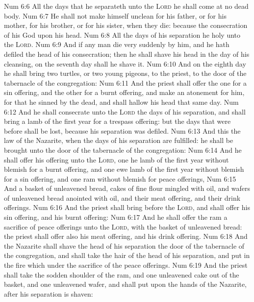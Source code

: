 \vs Num 6:6 All the days that he separateth  unto the \textsc{Lord} he shall come at no dead body.
\vs Num 6:7 He shall not make himself unclean for his father, or for his mother, for his brother, or for his sister, when they die: because the consecration of his God  upon his head.
\vs Num 6:8 All the days of his separation he  holy unto the \textsc{Lord}.
\vs Num 6:9 And if any man die very suddenly by him, and he hath defiled the head of his consecration; then he shall shave his head in the day of his cleansing, on the seventh day shall he shave it.
\vs Num 6:10 And on the eighth day he shall bring two turtles, or two young pigeons, to the priest, to the door of the tabernacle of the congregation:
\vs Num 6:11 And the priest shall offer the one for a sin offering, and the other for a burnt offering, and make an atonement for him, for that he sinned by the dead, and shall hallow his head that same day.
\vs Num 6:12 And he shall consecrate unto the \textsc{Lord} the days of his separation, and shall bring a lamb of the first year for a trespass offering: but the days that were before shall be lost, because his separation was defiled.
\vs Num 6:13 And this  the law of the Nazarite, when the days of his separation are fulfilled: he shall be brought unto the door of the tabernacle of the congregation:
\vs Num 6:14 And he shall offer his offering unto the \textsc{Lord}, one he lamb of the first year without blemish for a burnt offering, and one ewe lamb of the first year without blemish for a sin offering, and one ram without blemish for peace offerings,
\vs Num 6:15 And a basket of unleavened bread, cakes of fine flour mingled with oil, and wafers of unleavened bread anointed with oil, and their meat offering, and their drink offerings.
\vs Num 6:16 And the priest shall bring  before the \textsc{Lord}, and shall offer his sin offering, and his burnt offering:
\vs Num 6:17 And he shall offer the ram  a sacrifice of peace offerings unto the \textsc{Lord}, with the basket of unleavened bread: the priest shall offer also his meat offering, and his drink offering.
\vs Num 6:18 And the Nazarite shall shave the head of his separation  the door of the tabernacle of the congregation, and shall take the hair of the head of his separation, and put  in the fire which  under the sacrifice of the peace offerings.
\vs Num 6:19 And the priest shall take the sodden shoulder of the ram, and one unleavened cake out of the basket, and one unleavened wafer, and shall put  upon the hands of the Nazarite, after  his separation is shaven:
